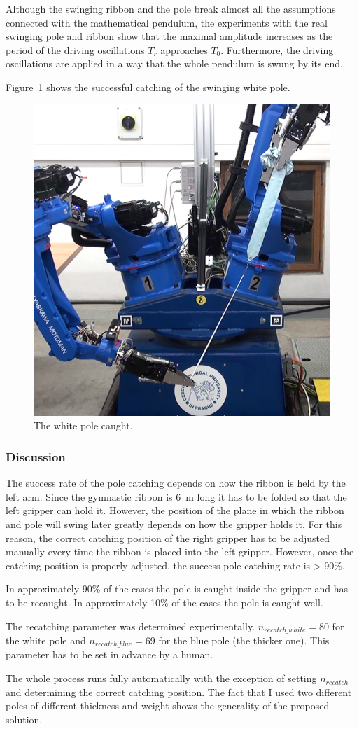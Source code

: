            Although the swinging ribbon and the pole break almost all the assumptions connected with the mathematical pendulum, the experiments with the real swinging pole and ribbon show that the maximal amplitude increases as the period of the driving oscillations $T_r$ approaches $T_0$. Furthermore, the driving oscillations are applied in a way that the whole pendulum is swung by its end.

            Figure~\ref{fig:PoleCaught} shows the successful catching of the swinging white pole.

            \begin{figure}[h]
            \includegraphics[height=0.4\textwidth]{PoleCaught.png}
            \centering
            \caption{The white pole caught.}
            \label{fig:PoleCaught}
            \end{figure}



        \subsubsection{Discussion}
            The success rate of the pole catching depends on how the ribbon is held by the left arm. Since the gymnastic ribbon is \SI{6}{m} long it has to be folded so that the left gripper can hold it. However, the position of the plane in which the ribbon and pole will swing later greatly depends on how the gripper holds it. For this reason, the correct catching position of the right gripper has to be adjusted manually every time the ribbon is placed into the left gripper. However, once the catching position is properly adjusted, the success pole catching rate is > 90\%.

            In approximately 90\% of the cases the pole is caught inside the gripper and has to be recaught. In approximately 10\% of the cases the pole is caught well.

            The recatching parameter was determined experimentally. $n_{recatch\_white} = 80$ for the white pole and $n_{recatch\_blue} = 69$ for the blue pole (the thicker one). This parameter has to be set in advance by a human.

            The whole process runs fully automatically with the exception of setting $n_{recatch}$ and determining the correct catching position. The fact that I used two different poles of different thickness and weight shows the generality of the proposed solution.


\clearpage 